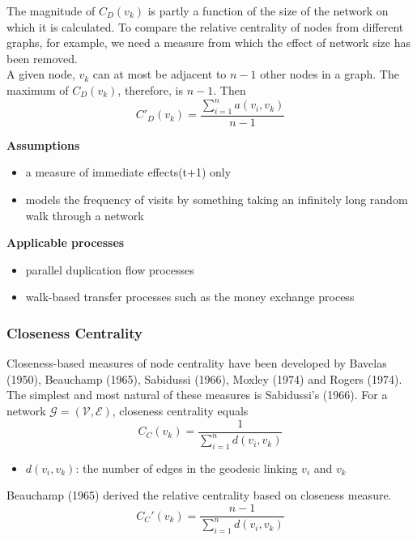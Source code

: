 \documentclass{beamer}
\begin{document}
\begin{frame}
The magnitude of $C_{D}(v_{k})$ is partly a function of the size of the network on which it is calculated. To compare the relative
centrality of nodes from different graphs, for example, we need a measure from which the effect of network size has been removed.	
\\
\bigskip
A given node, $v_{k}$ can at most be adjacent to $n-1$ other nodes in a graph. The maximum of $C_{D}(v_{k})$, therefore, is $n-1$. Then
\color{iseblue}
\begin{displaymath}
C'_{D}(v_{k})=\frac{\sum_{i=1}^n a(v_{i},v_{k})}{n-1}
\end{displaymath}
\end{frame}

\begin{frame}
\textbf{Assumptions}
\begin{itemize}
\item a measure of immediate effects(t+1) only
\item models the frequency of visits by something taking an infinitely long random walk through a network
\end{itemize}
\bigskip
\textbf{Applicable processes}
\begin{itemize}
\item parallel duplication flow processes
\item walk-based transfer processes such as the money exchange process
\end{itemize}
\end{frame}

\begin{frame}
\frametitle{Closeness Centrality}
Closeness-based measures of node centrality have been developed by Bavelas (1950), Beauchamp (1965), Sabidussi (1966), Moxley (1974) and Rogers (1974). The simplest and most natural of these measures is Sabidussi's (1966). 
For a network $\mathcal{G}=(\mathcal{V},\mathcal{E})$, closeness centrality equals
\color{iseblue}
\begin{equation}
	C_C(v_k) = \frac{1}{\sum_{i=1}^n d(v_i, v_k)}
\end{equation}
\color{black}
\begin{itemize}
\item $d(v_i, v_k)$: the number of edges in the geodesic linking $v_i$ and $v_k$
\end{itemize}
\end{frame}

\begin{frame}
Beauchamp (1965) derived the relative centrality based on closeness measure.
\color{iseblue}
\begin{equation}
	C_C'(v_k) = \frac{n-1}{\sum_{i=1}^n d(v_i, v_k)}
\end{equation}
\end{frame}
\end{document}
